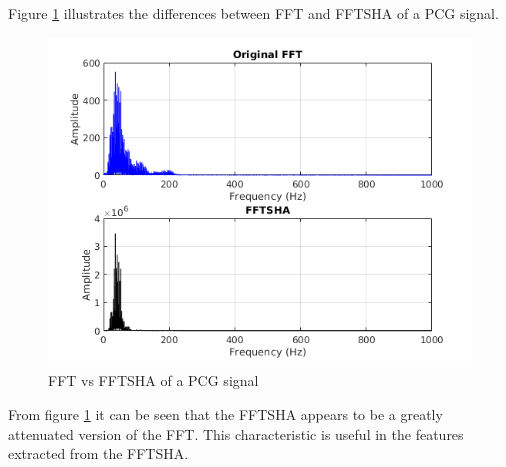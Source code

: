 \documentclass[10pt,twocolumn]{witseiepaper}
\begin{document}
Figure \ref{fig:fftvsha} illustrates the differences between FFT and FFTSHA of a PCG signal.
\begin{figure}[h!]
    \centering
    \includegraphics[scale=0.6]{./fftshavFFT.png}
    \caption{FFT vs FFTSHA of a PCG signal}
    \label{fig:fftvsha}
\end{figure}{}

From figure \ref{fig:fftvsha}  it can be seen that the FFTSHA appears to be a greatly attenuated version of the FFT. This characteristic is useful in the features extracted from the FFTSHA.
\end{document}
